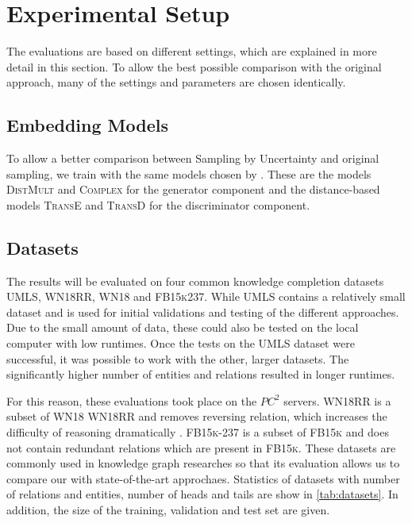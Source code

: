 \section{Experimental Setup}
\label{ch:evaluation:sec:experimental_setup}

The evaluations are based on different settings, which are explained in more detail in this section.
To allow the best possible comparison with the original \kbgan approach, many of the settings and parameters are chosen identically.


\subsection{Embedding Models}
To allow a better comparison between Sampling by Uncertainty and original sampling, we train with the same models chosen by \kbgan.
These are the models \textsc{DistMult} and \textsc{Complex} for the generator component and the distance-based models \textsc{TransE} and \textsc{TransD} for the discriminator component.

\subsection{Datasets}
\label{subsec:datasets}

The results will be evaluated on four common knowledge completion datasets  \textsc{UMLS}, \textsc{WN18RR}, \textsc{WN18} 
and \textsc{FB15k237}.
While \textsc{UMLS} contains a relatively small dataset and is used for initial validations and testing of the different approaches.
Due to the small amount of data, these could also be tested on the local computer with low runtimes.
Once the tests on the \textsc{UMLS} dataset were successful, it was possible to work with the other, larger datasets.
The significantly higher number of entities and relations resulted in longer runtimes.

For this reason, these evaluations took place on the $PC^2$ servers.
\textsc{WN18RR} is a subset of \textsc{WN18} \textsc{WN18RR} and removes reversing relation, which increases the difficulty of reasoning dramatically \cite{cai2017kbgan}.
\textsc{FB15k-237} is a subset of \textsc{FB15k} and does not contain redundant relations which are present in \textsc{FB15k}.
These datasets are commonly used in knowledge graph researches so that its evaluation allows us to compare our with state-of-the-art approchaes.
Statistics of datasets with number of relations and entities, number of heads and tails are show in \autoref{tab:datasets}. 
In addition, the size of the training, validation and test set are given.
        
